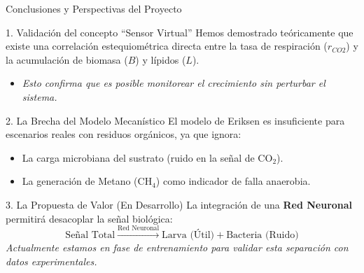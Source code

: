 \documentclass[aspectratio=169, 10pt]{beamer}
\begin{document}
\begin{frame}{Conclusiones y Perspectivas del Proyecto}

    \begin{block}{1. Validación del concepto ``Sensor Virtual''}
        Hemos demostrado teóricamente que existe una correlación estequiométrica directa entre la tasa de respiración ($r_{CO2}$) y la acumulación de biomasa ($B$) y lípidos ($L$).
        \begin{itemize}
            \item \footnotesize \textit{Esto confirma que es posible monitorear el crecimiento sin perturbar el sistema.}
        \end{itemize}
    \end{block}

    \vspace{0.2cm}

    \begin{alertblock}{2. La Brecha del Modelo Mecanístico}
        El modelo de Eriksen es insuficiente para escenarios reales con residuos orgánicos, ya que ignora:
        \begin{itemize}
            \item La carga microbiana del sustrato (ruido en la señal de CO$_2$).
            \item La generación de Metano (CH$_4$) como indicador de falla anaerobia.
        \end{itemize}
    \end{alertblock}

    \vspace{0.2cm}

    \begin{exampleblock}{3. La Propuesta de Valor (En Desarrollo)}
        La integración de una \textbf{Red Neuronal} permitirá desacoplar la señal biológica:
        $$ \text{Señal Total} \xrightarrow{\text{Red Neuronal}} \text{Larva (Útil)} + \text{Bacteria (Ruido)} $$
        \footnotesize \textit{Actualmente estamos en fase de entrenamiento para validar esta separación con datos experimentales.}
    \end{exampleblock}

\end{frame}
\end{document}
